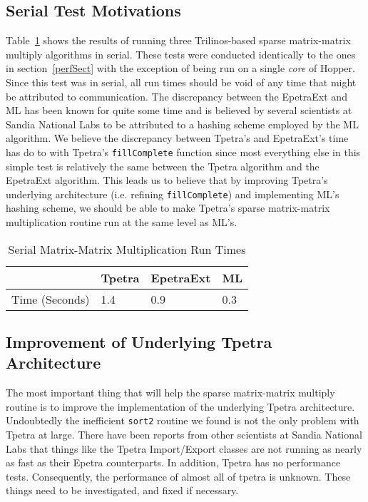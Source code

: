 \documentclass[pdf,12pt]{SANDreport}
\begin{document}
\subsection{Serial Test Motivations}
Table~\ref{serialTable} shows the results of running three Trilinos-based sparse matrix-matrix multiply algorithms in 
serial. These tests were conducted identically to the ones in section~\ref{perfSect} with the exception of being run on a 
single \emph{core} of Hopper. Since this test was in serial, all run times should be void of any time that might be 
attributed to communication. The discrepancy between the EpetraExt and ML has been known for quite some time and 
is believed by several scientists at Sandia National Labs to be attributed to a hashing scheme employed by the ML algorithm.
We believe the discrepancy between Tpetra's and EpetraExt's time has do to with Tpetra's 
\verb!fillComplete! function since most everything else in this simple test 
is relatively the same between the Tpetra algorithm and the EpetraExt algorithm. This leads us to believe that
by improving Tpetra's underlying architecture (i.e. refining \verb!fillComplete!) and implementing ML's hashing
scheme, we should be able to make Tpetra's sparse matrix-matrix multiplication routine run at the same level as ML's.

\begin{table}
\centering
\begin{tabular}{ | l | l | l | l | }
\hline
 & Tpetra & EpetraExt & ML \\ \hline
Time (Seconds) & 1.4 & 0.9 & 0.3 \\ \hline
\end{tabular}
\caption{Serial Matrix-Matrix Multiplication Run Times}
\label{serialTable}
\end{table}

\subsection{Improvement of Underlying Tpetra Architecture}
The most important thing that will help the sparse matrix-matrix multiply routine is to improve the implementation of the
underlying Tpetra architecture. 
Undoubtedly the inefficient \verb!sort2! routine we found is not the only problem with Tpetra at large. There have been 
reports from other scientists at Sandia National Labs that things like the Tpetra Import/Export classes are not running as 
nearly as fast as their Epetra counterparts. In addition, Tpetra has no performance tests. Consequently, the performance of 
almost all of tpetra is unknown. These things need to be investigated, and fixed if necessary.
\end{document}

